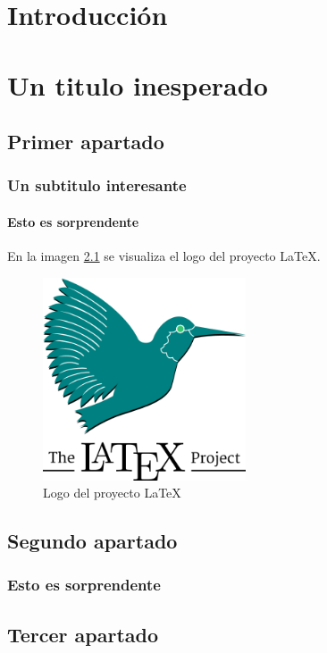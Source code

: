 \documentclass[12pt]{report}
\begin{document}
\tableofcontents

\chapter{Introducción}
   \lipsum[1-3]

\chapter{Un titulo inesperado}
\section{Primer apartado}
   \lipsum[4-5]
\subsection{Un subtitulo interesante}
   \lipsum[6]
\subsubsection{Esto es sorprendente}
   \lipsum[2-3]
   En la imagen \ref{fig:proyecto_latex} se visualiza el logo del proyecto \LaTeX.

\begin{figure}[ht]
   \centering
   \includegraphics[width=6cm]{latex.png}
   \caption{Logo del proyecto \LaTeX}
   \label{fig:proyecto_latex}
\end{figure}
\section{Segundo apartado}
   \lipsum[1]
   \subsection{Esto es sorprendente}
   \lipsum[2]
\section{Tercer apartado}
\end{document}
